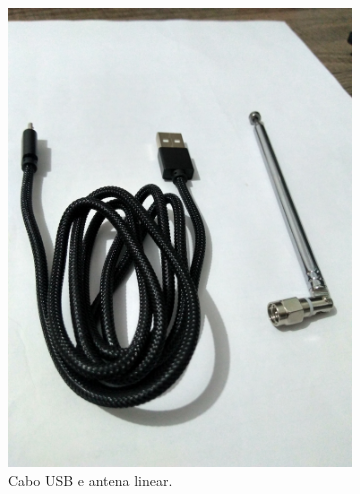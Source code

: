 \documentclass[
  12pt,				%
  openright,			%
  twoside,			%
  a4paper,			%
  english,			%
  french,				%
  spanish,			%
  brazil,				%
  ]{abntex2}
\begin{document}
\newpage
\begin{figure}[!htb]
  \centering
  \begin{subfigure}[b]{0.45\linewidth}
    \centering
    \includegraphics[width=\linewidth]{figures/hackrf/hack_rf_cabo_usb_antena_linear.jpg}
    \caption{Cabo USB e antena linear.}
    \label{fig:hack_rf_cabo_usb_antena_linear}
  \end{subfigure}
  \hspace{0.5cm}
  \begin{subfigure}[b]{0.45\linewidth}
    \centering

\end{subfigure}
\end{figure}
\end{document}
